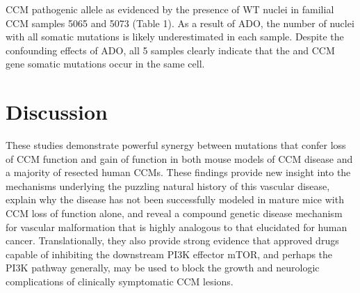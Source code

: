 CCM pathogenic allele as evidenced by the presence of WT nuclei in familial CCM samples 5065 and 5073 (Table 1). As a result of ADO, the number of nuclei with all somatic mutations is likely underestimated in each sample. Despite the confounding effects of ADO, all 5 samples clearly indicate that the  and CCM gene somatic mutations occur in the same cell.

\section{Discussion}
These studies demonstrate powerful synergy between mutations that confer loss of CCM function and gain of  function in both mouse models of CCM disease and a majority of resected human CCMs. These findings provide new insight into the mechanisms underlying the puzzling natural history of this vascular disease, explain why the disease has not been successfully modeled in mature mice with CCM loss of function alone, and reveal a compound genetic disease mechanism for vascular malformation that is highly analogous to that elucidated for human cancer. Translationally, they also provide strong evidence that approved drugs capable of inhibiting the downstream PI3K effector mTOR, and perhaps the PI3K pathway generally, may be used to block the growth and neurologic complications of clinically symptomatic CCM lesions.  

